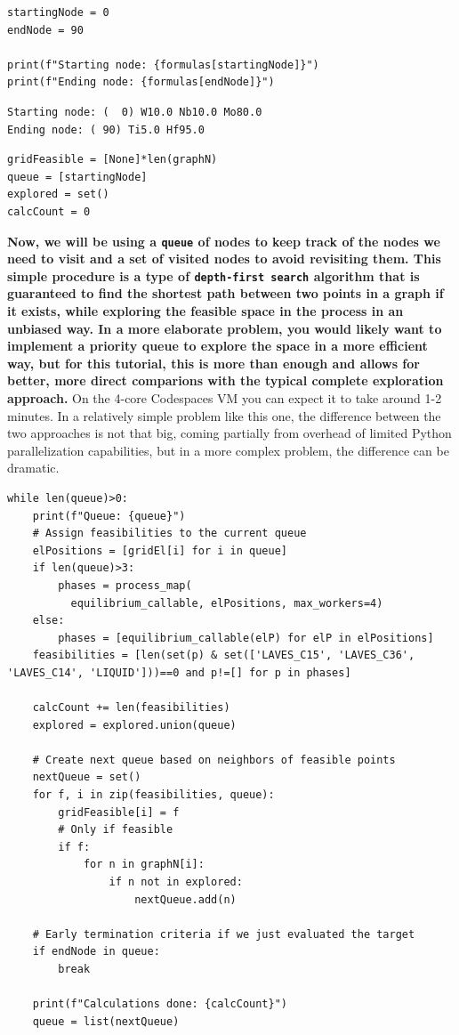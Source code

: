 \begin{verbatim}
startingNode = 0
endNode = 90

print(f"Starting node: {formulas[startingNode]}")
print(f"Ending node: {formulas[endNode]}")
\end{verbatim}

\begin{verbatim}
Starting node: (  0) W10.0 Nb10.0 Mo80.0 
Ending node: ( 90) Ti5.0 Hf95.0 
\end{verbatim}

\begin{verbatim}
gridFeasible = [None]*len(graphN)
queue = [startingNode]
explored = set()
calcCount = 0
\end{verbatim}

\textbf{Now, we will be using a \texttt{queue} of nodes
to keep track of the nodes we need to visit and a set of visited nodes
to avoid revisiting them. This simple procedure is a type of
\texttt{depth-first search} algorithm that is
guaranteed to find the shortest path between two points in a graph if it
exists, while exploring the feasible space in the process in an unbiased
way. In a more elaborate problem, you would likely want to implement a
priority queue to explore the space in a more efficient way, but for
this tutorial, this is more than enough and allows for better, more
direct comparions with the typical complete exploration approach.} On
the 4-core Codespaces VM you can expect it to take around 1-2 minutes.
In a relatively simple problem like this one, the difference between the
two approaches is not that big, coming partially from overhead of
limited Python parallelization capabilities, but in a more complex
problem, the difference can be dramatic.

\begin{verbatim}
while len(queue)>0:
    print(f"Queue: {queue}")
    # Assign feasibilities to the current queue
    elPositions = [gridEl[i] for i in queue]
    if len(queue)>3:
        phases = process_map(
          equilibrium_callable, elPositions, max_workers=4)
    else:
        phases = [equilibrium_callable(elP) for elP in elPositions]
    feasibilities = [len(set(p) & set(['LAVES_C15', 'LAVES_C36', 'LAVES_C14', 'LIQUID']))==0 and p!=[] for p in phases]

    calcCount += len(feasibilities)
    explored = explored.union(queue)

    # Create next queue based on neighbors of feasible points
    nextQueue = set()
    for f, i in zip(feasibilities, queue):
        gridFeasible[i] = f
        # Only if feasible
        if f:
            for n in graphN[i]:
                if n not in explored:
                    nextQueue.add(n)

    # Early termination criteria if we just evaluated the target
    if endNode in queue:
        break

    print(f"Calculations done: {calcCount}")
    queue = list(nextQueue)
\end{verbatim}

